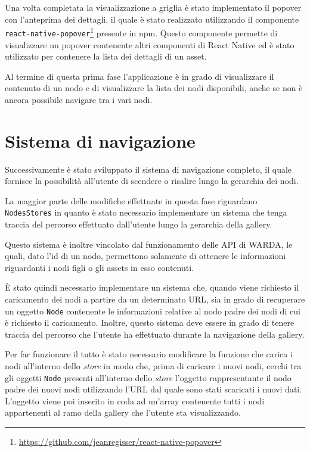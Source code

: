 Una volta completata la visualizzazione a griglia è stato implementato il popover con l'anteprima dei dettagli, il quale è stato realizzato utilizzando il componente \texttt{react-native-popover}\footnote{\url{https://github.com/jeanregisser/react-native-popover}} presente in npm. 
Questo componente permette di visualizzare un popover contenente altri componenti di React Native ed è stato utilizzato per contenere la lista dei dettagli di un asset.

Al termine di questa prima fase l'applicazione è in grado di visualizzare il contenuto di un nodo e di visualizzare la lista dei nodi disponibili, anche se non è ancora possibile navigare tra i vari nodi.

\section{Sistema di navigazione}

Successivamente è stato sviluppato il sistema di navigazione completo, il quale fornisce la possibilità all'utente di scendere o risalire lungo la gerarchia dei nodi.

La maggior parte delle modifiche effettuate in questa fase riguardano \texttt{NodesStores} in quanto è stato necessario implementare un sistema che tenga traccia del percorso effettuato dall'utente lungo la gerarchia della gallery.

Questo sistema è inoltre vincolato dal funzionamento delle API di WARDA, le quali, dato l'id di un nodo, permettono solamente di ottenere le informazioni riguardanti i nodi figli o gli assets in esso contenuti.

\`E stato quindi necessario implementare un sistema che, quando viene richiesto il caricamento dei nodi a partire da un determinato URL, sia in grado di recuperare un oggetto \texttt{Node} contenente le informazioni relative al nodo padre dei nodi di cui è richiesto il caricamento.
Inoltre, questo sistema deve essere in grado di tenere traccia del percorso che l'utente ha effettuato durante la navigazione della gallery.

Per far funzionare il tutto è stato necessario modificare la funzione che carica i nodi all'interno dello \textit{store} in modo che, prima di caricare i nuovi nodi, cerchi tra gli oggetti \texttt{Node} presenti all'interno dello \textit{store} l'oggetto rappresentante il nodo padre dei nuovi nodi utilizzando l'URL dal quale sono stati scaricati i nuovi dati.
L'oggetto viene poi inserito in coda ad un'array contenente tutti i nodi appartenenti al ramo della gallery che l'utente sta visualizzando.

